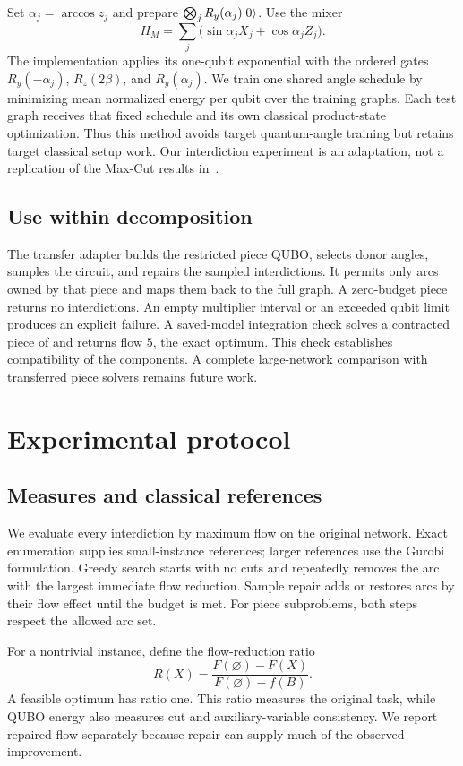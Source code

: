 \documentclass[review,onefignum,onetabnum]{siamart171218}
\begin{document}
Set $\alpha_j=\arccos z_j$ and prepare $\bigotimes_j R_y(\alpha_j)\lvert 0\rangle$.
Use the mixer
\begin{equation}\label{eq:warm-mixer}
 H_M=\sum_j\bigl(\sin\alpha_jX_j+\cos\alpha_jZ_j\bigr).
\end{equation}
The implementation applies its one-qubit exponential with the ordered gates
$R_y(-\alpha_j)$, $R_z(2\beta)$, and $R_y(\alpha_j)$.
We train one shared angle schedule by minimizing mean normalized energy per qubit over the training graphs.
Each test graph receives that fixed schedule and its own classical product-state optimization.
Thus this method avoids target quantum-angle training but retains target classical setup work.
Our interdiction experiment is an adaptation, not a replication of the Max-Cut results in~\cite{he2026}.

\subsection{Use within decomposition}
The transfer adapter builds the restricted piece QUBO, selects donor angles, samples the circuit, and repairs the sampled interdictions.
It permits only arcs owned by that piece and maps them back to the full graph.
A zero-budget piece returns no interdictions.
An empty multiplier interval or an exceeded qubit limit produces an explicit failure.
A saved-model integration check solves a contracted piece of  and returns flow $5$, the exact optimum.
This check establishes compatibility of the components.
A complete large-network comparison with transferred piece solvers remains future work.

\section{Experimental protocol}\label{sec:protocol}
\subsection{Measures and classical references}
We evaluate every interdiction by maximum flow on the original network.
Exact enumeration supplies small-instance references; larger references use the Gurobi formulation.
Greedy search starts with no cuts and repeatedly removes the arc with the largest immediate flow reduction.
Sample repair adds or restores arcs by their flow effect until the budget is met.
For piece subproblems, both steps respect the allowed arc set.

For a nontrivial instance, define the flow-reduction ratio
\begin{equation}\label{eq:flow-ratio}
 R(X)=\frac{F(\varnothing)-F(X)}{F(\varnothing)-f(B)}.
\end{equation}
A feasible optimum has ratio one.
This ratio measures the original task, while QUBO energy also measures cut and auxiliary-variable consistency.
We report repaired flow separately because repair can supply much of the observed improvement.
\end{document}
